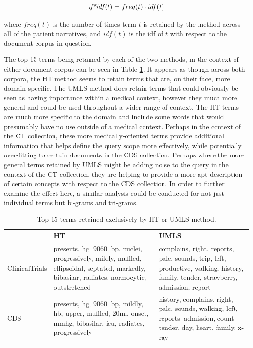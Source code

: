 \documentclass[a4paper]{report}
\begin{document}
$$\text{\textit{tf*idf}}(t) = freq(t)\cdot idf(t)$$

where $freq(t)$ is the number of times term $t$ is retained by the method across all of the patient narratives, and $idf(t)$ is the idf of $t$ with respect to the document corpus in question. 

The top 15 terms being retained by each of the two methods, in the context of either document corpus can be seen in Table \ref{retained-terms}. It appears as though across both corpora, the HT method seems to retain terms that are, on their face, more domain specific. The UMLS method does retain terms that could obviously be seen as having importance within a medical context, however they much more general and could be used throughout a wider range of context. The HT terms are much more specific to the domain and include some words that would presumably have no use outside of a medical context. Perhaps in the context of the CT collection, these more medically-oriented terms provide additional information that helps define the query scope more effectively, while potentially over-fitting to certain documents in the CDS collection. Perhaps where the more general terms retained by UMLS might be adding noise to the query in the context of the CT collection, they are helping to provide a more apt description of certain concepts with respect to the CDS collection. In order to further examine the effect here, a similar analysis could be conducted for not just individual terms but bi-grams and tri-grams. 

\begin{table}
\caption{Top 15 terms retained exclusively by HT or UMLS method.}
\label{retained-terms}
\begin{center}
  \begin{tabular}{|p{2cm}|p{5cm}|p{5cm}|}
  	\hline
      & \textbf{HT} & \textbf{UMLS}\\
     \hline
    ClinicalTrials & presents, hg, 9060, bp, nuclei, progressively, mildly, muffled, ellipsoidal, septated, markedly, bibasilar, radiates, normocytic, outstretched & complains, right, reports, pale, sounds, trip, left, productive, walking, history, family, tender, strawberry, admission, report\\
    \hline
    CDS & presents, hg, 9060, bp, mildly, hb, upper, muffled, 20ml, onset, mmhg, bibasilar, icu, radiates, progressively & history, complains, right, pale, sounds, walking, left, reports, admission, count, tender, day, heart, family, x-ray \\
    \hline
  \end{tabular}
\end{center}
\end{table}
\end{document}
